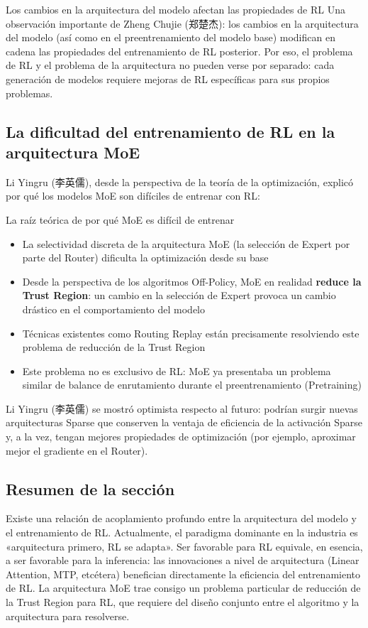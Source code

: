 \begin{knowledgebox}{Los cambios en la arquitectura del modelo afectan las propiedades de RL}
Una observación importante de Zheng Chujie (郑楚杰): los cambios en la arquitectura del modelo (así como en el preentrenamiento del modelo base) modifican en cadena las propiedades del entrenamiento de RL posterior. Por eso, el problema de RL y el problema de la arquitectura no pueden verse por separado: cada generación de modelos requiere mejoras de RL específicas para sus propios problemas.
\end{knowledgebox}

\subsection{La dificultad del entrenamiento de RL en la arquitectura MoE}

Li Yingru (李英儒), desde la perspectiva de la teoría de la optimización, explicó por qué los modelos MoE son difíciles de entrenar con RL:

\begin{warningbox}{La raíz teórica de por qué MoE es difícil de entrenar}
\begin{itemize}
    \item La selectividad discreta de la arquitectura MoE (la selección de Expert por parte del Router) dificulta la optimización desde su base
    \item Desde la perspectiva de los algoritmos Off-Policy, MoE en realidad \textbf{reduce la Trust Region}: un cambio en la selección de Expert provoca un cambio drástico en el comportamiento del modelo
    \item Técnicas existentes como Routing Replay están precisamente resolviendo este problema de reducción de la Trust Region
    \item Este problema no es exclusivo de RL: MoE ya presentaba un problema similar de balance de enrutamiento durante el preentrenamiento (Pretraining)
\end{itemize}
\end{warningbox}

Li Yingru (李英儒) se mostró optimista respecto al futuro: podrían surgir nuevas arquitecturas Sparse que conserven la ventaja de eficiencia de la activación Sparse y, a la vez, tengan mejores propiedades de optimización (por ejemplo, aproximar mejor el gradiente en el Router).

\subsection{Resumen de la sección}

Existe una relación de acoplamiento profundo entre la arquitectura del modelo y el entrenamiento de RL. Actualmente, el paradigma dominante en la industria es «arquitectura primero, RL se adapta». Ser favorable para RL equivale, en esencia, a ser favorable para la inferencia: las innovaciones a nivel de arquitectura (Linear Attention, MTP, etcétera) benefician directamente la eficiencia del entrenamiento de RL. La arquitectura MoE trae consigo un problema particular de reducción de la Trust Region para RL, que requiere del diseño conjunto entre el algoritmo y la arquitectura para resolverse.
